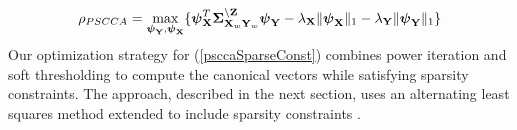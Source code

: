 \documentclass{llncs}
\newcommand{\X}{{\bf X}}
\newcommand{\Y}{{\bf Y}}
\newcommand{\Z}{{\bf Z}}
\newcommand{\bs}{\boldsymbol}
\begin{document}
\begin{equation}
\label{psccaSparseConst}
\rho_{PSCCA}=\max_{{\bs\psi_{\Y}}, {\bs\psi_{\X}}} \{ \bs\psi_{\X}^T \bs\Sigma_{\X_w\Y_w}^{\backslash \Z}\bs\psi_{\Y} - \lambda_{\X}\|\bs\psi_{\X}\|_1 - \lambda_{\Y}\|\bs\psi_{\Y}\|_1\}
\end{equation}
Our optimization strategy for (\ref{psccaSparseConst}) combines power
iteration and soft thresholding to compute the canonical vectors while
satisfying sparsity constraints.  The approach, described in the next
section, uses an alternating least squares method
\cite{golub} extended to include sparsity constraints
\cite{cichocki}. 



\end{document}
